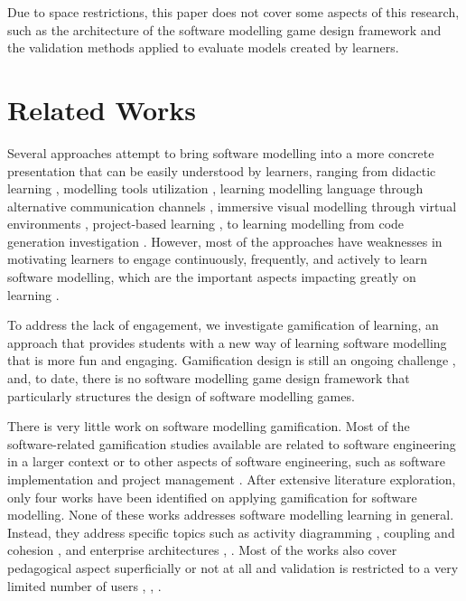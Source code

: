 \documentclass[runningheads,a4paper]{llncs}
\begin{document}
Due to space restrictions, this paper does not cover some aspects of this research, such as the architecture of the software modelling game design framework and the validation methods applied to evaluate models created by learners. 

\section{Related Works}
Several approaches attempt to bring software modelling into a more concrete presentation that can be easily understood by learners, ranging from didactic learning \cite{moisan2009teaching}, modelling tools utilization \cite{Akayama2013}, learning modelling language through alternative communication channels \cite{Brandsteidl2011}, immersive visual modelling through virtual environments \cite{neubauer2003immersive}, project-based learning \cite{Szmurlo2007}, to learning modelling from code generation investigation \cite{schmidt2014teaching}. However, most of the approaches have weaknesses in motivating learners to engage continuously, frequently, and actively to learn software modelling, which are the important aspects impacting greatly on learning \cite{Naps2005}. 

To address the lack of engagement, we investigate gamification of learning, an approach that provides students with a new way of learning software modelling that is more fun and engaging. Gamification design is still an ongoing challenge \cite{Deterding2013}, and, to date, there is no software modelling game design framework that particularly structures the design of software modelling games.

There is very little work on software modelling gamification. Most of the software-related gamification studies available are related to software engineering in a larger context or to other aspects of software engineering, such as software implementation and project management \cite{Pedreira2015}. After extensive literature exploration, only four works have been identified on applying gamification for software modelling. None of these works addresses software modelling learning in general. Instead, they address specific topics such as activity diagramming \cite{Richardsen2014}, coupling and cohesion \cite{Stikkolorum2014}, and enterprise architectures \cite{Groenewegen2010}, \cite{Ionita2015}. Most of the works also cover pedagogical aspect superficially or not at all and validation is restricted to a very limited number of users \cite{Richardsen2014}, \cite{Stikkolorum2014}, \cite{Groenewegen2010}.
\end{document}
